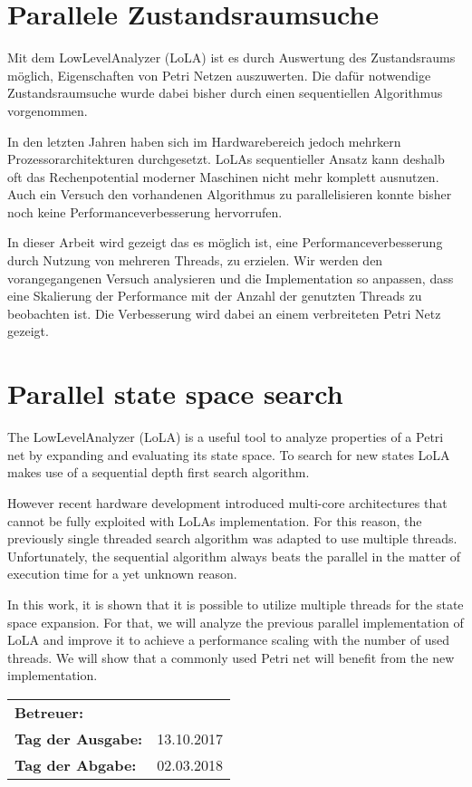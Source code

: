 \section*{Parallele Zustandsraumsuche}
Mit dem LowLevelAnalyzer (LoLA) ist es durch Auswertung des Zustandsraums möglich, Eigenschaften von Petri Netzen auszuwerten. Die dafür notwendige Zustandsraumsuche wurde dabei bisher durch einen sequentiellen Algorithmus vorgenommen.

In den letzten Jahren haben sich im Hardwarebereich jedoch mehrkern Prozessorarchitekturen durchgesetzt. LoLAs sequentieller Ansatz kann deshalb oft das Rechenpotential moderner Maschinen nicht mehr komplett ausnutzen. Auch ein Versuch den vorhandenen Algorithmus zu parallelisieren konnte bisher noch keine Performanceverbesserung hervorrufen.

In dieser Arbeit wird gezeigt das es möglich ist, eine Performanceverbesserung durch Nutzung von mehreren Threads, zu erzielen. Wir werden den vorangegangenen Versuch analysieren und die Implementation so anpassen, dass eine Skalierung der Performance mit der Anzahl der genutzten Threads zu beobachten ist. Die Verbesserung wird dabei an einem verbreiteten Petri Netz gezeigt.

\section*{Parallel state space search}
The LowLevelAnalyzer (LoLA) is a useful tool to analyze properties of a Petri net by expanding and evaluating its state space. To search for new states LoLA makes use of a sequential depth first search algorithm.

However recent hardware development introduced multi-core architectures that cannot be fully exploited with LoLAs implementation. For this reason, the previously single threaded search algorithm was adapted to use multiple threads. Unfortunately, the sequential algorithm always beats the parallel in the matter of execution time for a yet unknown reason.

In this work, it is shown that it is possible to utilize multiple threads for the state space expansion. For that, we will analyze the previous parallel implementation of LoLA and improve it to achieve a performance scaling with the number of used threads. We will show that a commonly used Petri net will benefit from the new implementation.



\vfill

\begin{tabular}{ll}
	\bfseries Betreuer: & \parbox[t]{10cm}{\betreuer }\vspace{5mm} \\
	\bfseries Tag der Ausgabe: & 13.10.2017 \\
	\bfseries Tag der Abgabe: & 02.03.2018 \\
\end{tabular}